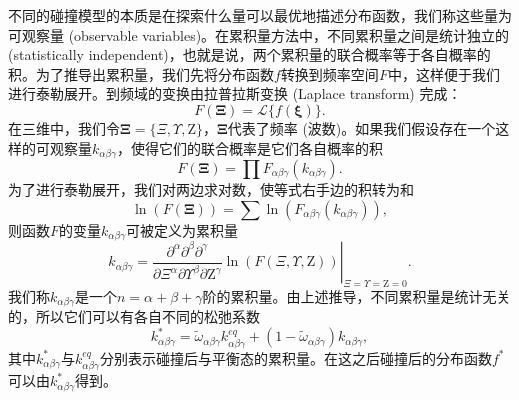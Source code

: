 不同的碰撞模型的本质是在探索什么量可以最优地描述分布函数，我们称这些量为可观察量 (observable variables)。在累积量方法中，不同累积量之间是统计独立的 (statistically independent)，也就是说，两个累积量的联合概率等于各自概率的积。为了推导出累积量，我们先将分布函数$f$转换到频率空间$F$中，这样便于我们进行泰勒展开。到频域的变换由拉普拉斯变换 (Laplace transform) 完成：
\begin{equation}
F(\boldsymbol{\Xi})=\mathcal{L}\{f(\boldsymbol{\xi})\}.
\end{equation}
在三维中，我们令$\boldsymbol{\Xi}=\{\Xi, \Upsilon, \mathrm{Z}\}$，$\boldsymbol{\Xi}$代表了频率 (波数)。如果我们假设存在一个这样的可观察量$k_{\alpha\beta\gamma}$，使得它们的联合概率是它们各自概率的积
\begin{equation}
F(\boldsymbol{\Xi})=\prod F_{\alpha \beta \gamma}\left(k_{\alpha \beta \gamma}\right).
\end{equation}
为了进行泰勒展开，我们对两边求对数，使等式右手边的积转为和
\begin{equation}
\ln (F(\boldsymbol{\Xi}))=\sum \ln \left(F_{\alpha \beta \gamma}\left(k_{\alpha \beta \gamma}\right)\right),
\end{equation}
则函数$F$的变量$k_{\alpha \beta \gamma}$可被定义为累积量
\begin{equation}
k_{\alpha \beta \gamma}=\left. \frac{\partial^{\alpha} \partial^{\beta} \partial^{\gamma}}{\partial \Xi^{\alpha} \partial \Upsilon^{\beta} \partial \mathrm{Z}^{\gamma}} \ln (F(\Xi, \Upsilon, \mathrm{Z}))\right|_{\Xi=\Upsilon=\mathrm{Z}=0}.
\end{equation}
我们称$k_{\alpha \beta \gamma}$是一个$n=\alpha+\beta+\gamma$阶的累积量。由上述推导，不同累积量是统计无关的，所以它们可以有各自不同的松弛系数
\begin{equation}
k_{\alpha \beta \gamma}^{*}=\tilde{\omega}_{\alpha \beta \gamma} k_{\alpha \beta \gamma}^{e q}+\left(1-\tilde{\omega}_{\alpha \beta \gamma}\right) k_{\alpha \beta \gamma},
\end{equation}
其中$k_{\alpha \beta \gamma}^{*}$与$k_{\alpha \beta \gamma}^{eq}$分别表示碰撞后与平衡态的累积量。在这之后碰撞后的分布函数$f^*$可以由$k_{\alpha \beta \gamma}^{*}$得到。


